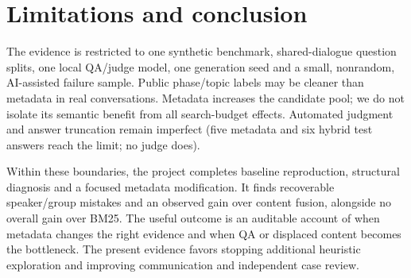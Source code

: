 \documentclass[10pt,a4paper]{article}
\begin{document}
\clearpage
\section{Limitations and conclusion}
The evidence is restricted to one synthetic benchmark, shared-dialogue question splits, one local QA/judge model, one generation seed and a small, nonrandom, AI-assisted failure sample. Public phase/topic labels may be cleaner than metadata in real conversations. Metadata increases the candidate pool; we do not isolate its semantic benefit from all search-budget effects. Automated judgment and answer truncation remain imperfect (five metadata and six hybrid test answers reach the limit; no judge does).

Within these boundaries, the project completes baseline reproduction, structural diagnosis and a focused metadata modification. It finds recoverable speaker/group mistakes and an observed gain over content fusion, alongside no overall gain over BM25. The useful outcome is an auditable account of when metadata changes the right evidence and when QA or displaced content becomes the bottleneck. The present evidence favors stopping additional heuristic exploration and improving communication and independent case review.



\end{document}
